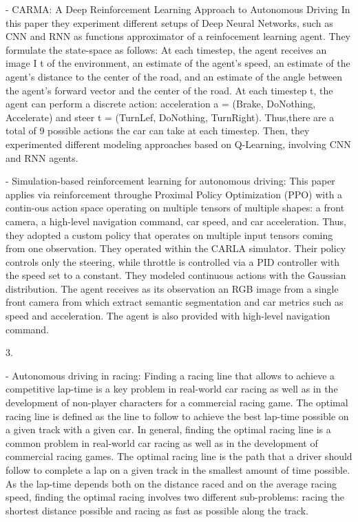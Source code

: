 - CARMA: A Deep Reinforcement Learning Approach to Autonomous Driving
In this paper they experiment different setups of Deep Neural Networks, such as CNN and RNN as functions approximator of a reinfocement learning agent.
They formulate the state-space as follows: At each timestep, the agent receives an image I t of the environment, an estimate of the agent's speed, an estimate of the agent's distance to the center of the road, and an estimate of the angle between the agent's forward vector and the center of the road. At each timestep t, the agent can perform a discrete action: acceleration a = (Brake, DoNothing, Accelerate) and steer t = (TurnLef, DoNothing, TurnRight). Thus,there are a total of 9 possible actions the car can take at each timestep.
Then, they experimented different modeling approaches based on Q-Learning, involving CNN and RNN agents.


- Simulation-based reinforcement learning for autonomous driving:
This paper applies via reinforcement throughe Proximal Policy Optimization (PPO) with a contin-ous action space operating on multiple tensors of multiple shapes: a front camera, a high-level navigation command, car speed, and car acceleration. Thus, they adopted a custom policy that operates on multiple input tensors coming from one observation. They operated within the CARLA simulator. Their policy controls only the steering, while throttle is controlled via a PID controller with the speed set to a constant.
They modeled continuous actions with the Gaussian distribution.
The agent receives as its observation an RGB image from a single front camera from which extract semantic segmentation and car metrics such as speed and acceleration. The agent is also provided with high-level navigation command. 

	
3.

- Autonomous driving in racing:
Finding a racing line that allows to achieve a competitive lap-time is a key problem in real-world car racing as well as in the development of non-player characters for a commercial racing game.
The optimal racing line is defined as the line to follow to achieve the best lap-time possible on a given track with a given car. In general, finding the optimal racing line is
a common problem in real-world car racing as well as in the development of commercial racing games. The optimal racing line is the path that a driver should follow to complete a lap on a given track in the smallest amount of time possible. As the lap-time depends both on the distance raced and on the average racing speed, finding the optimal racing involves two different sub-problems: racing the shortest distance possible and racing as fast
as possible along the track.


